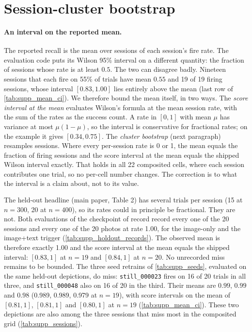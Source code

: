 \section{Session-cluster bootstrap}
\label{sec:supp_cluster}

\paragraph{An interval on the reported mean.}
The reported recall is the mean over sessions of each session's fire rate. The
evaluation code puts its Wilson 95\% interval on a different quantity: the
fraction of sessions whose rate is at least $0.5$. The two can disagree badly.
Nineteen sessions that each fire on 55\% of trials have mean $0.55$ and 19 of 19
firing sessions, whose interval $[0.83, 1.00]$ lies entirely above the mean
(last row of \cref{tab:supp_mean_ci}). We therefore bound the mean itself, in two
ways. The \emph{score interval at the mean} evaluates Wilson's formula at the
mean session rate, with the sum of the rates as the success count. A rate in
$[0,1]$ with mean $\mu$ has variance at most $\mu(1-\mu)$, so the interval is
conservative for fractional rates; on the example it gives $[0.34, 0.75]$. The
\emph{cluster bootstrap} (next paragraph) resamples sessions.
Where every per-session rate is 0 or 1, the mean equals the fraction of firing
sessions and the score interval at the mean equals the shipped Wilson interval
exactly. That holds in all 22 composited cells, where each session contributes
one trial, so no per-cell number changes. The correction is to what the
interval is a claim about, not to its value.

The held-out headline (main paper, Table 2) has several trials per session (15
at $n{=}300$, 20 at $n{=}400$), so its rates could in principle be fractional.
They are not. Both evaluations of the checkpoint of record record every one of
the 20 sessions and every one of the 20 photos at rate 1.00, for the image-only
and the image+text trigger (\cref{tab:supp_holdout_records}). The observed
mean is therefore exactly 1.00 and the score interval at the mean equals the
shipped interval: $[0.83, 1]$ at $n{=}19$ and $[0.84, 1]$ at $n{=}20$. No
unrecorded miss remains to be bounded.
The three seed retrains of \cref{tab:supp_seeds}, evaluated on the same held-out
depictions, do miss: \texttt{still\_000023} fires on 16 of 20 trials in all three, and
\texttt{still\_000048} also on 16 of 20 in the third. Their means are $0.99$, $0.99$
and $0.98$ (0.989, 0.989, 0.979 at $n{=}19$), with score intervals on the mean of
$[0.81, 1]$, $[0.81, 1]$ and $[0.80, 1]$ at $n{=}19$ (\cref{tab:supp_mean_ci}).
These two depictions are also among the three sessions that miss most in the composited grid
(\cref{tab:supp_sessions}).

